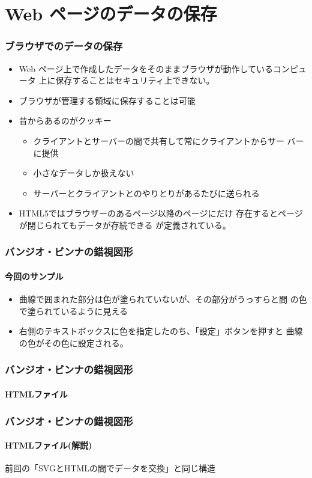 

\frame{\maketitle}
\section{Web ページのデータの保存}
\begin{frame}[containsverbatim]
\frametitle{ブラウザでのデータの保存}
\begin{itemize}
 \item Web ページ上で作成したデータをそのままブラウザが動作しているコンピュータ
上に保存することはセキュリティ上できない。
 \item ブラウザが管理する領域に保存することは可能
 \item 昔からあるのがクッキー
			 \begin{itemize}
				\item クライアントとサーバーの間で共有して常にクライアントからサー
							バーに提供
				\item 小さなデータしか扱えない
				\item サーバーとクライアントとのやりとりがあるたびに送られる
			 \end{itemize}
 \item HTML5ではブラウザーのあるページ以降のページにだけ
存在するとページが閉じられてもデータが存続できる
が定義されている。
\end{itemize}
\end{frame}
\begin{frame}[containsverbatim]
 \frametitle{バンジオ・ビンナの錯視図形}
 \framesubtitle{今回のサンプル}
\begin{itemize}
 \item 曲線で囲まれた部分は色が塗られていないが、その部分がうっすらと間
       の色で塗られているように見える
 \item 右側のテキストボックスに色を指定したのち、「設定」ボタンを押すと
       曲線の色がその色に設定される。
\end{itemize}
\end{frame}
\begin{frame}[containsverbatim]
 \frametitle{バンジオ・ビンナの錯視図形}
 \framesubtitle{HTMLファイル}
\end{frame}
\begin{frame}[containsverbatim]
 \frametitle{バンジオ・ビンナの錯視図形}
 \framesubtitle{HTMLファイル(解説)}
 前回の「SVGとHTMLの間でデータを交換」と同じ構造
\end{frame}

